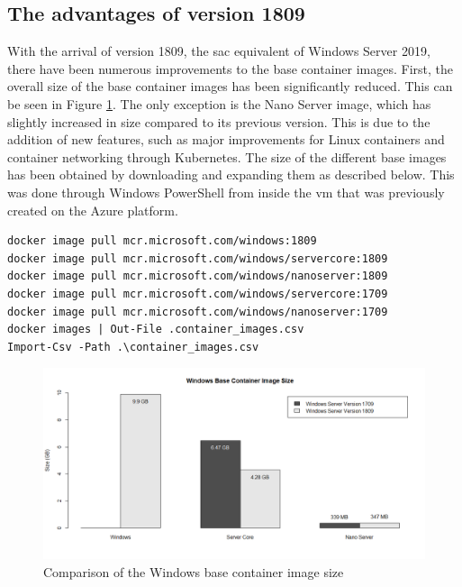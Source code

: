 \subsection{The advantages of version 1809}
With the arrival of version 1809, the \acrfull{sac} equivalent of Windows Server 2019, there have been numerous improvements to the base container images. 
First, the overall size of the base container images has been significantly reduced. 
This can be seen in Figure \ref{fig:Containers}. 
The only exception is the Nano Server image, which has slightly increased in size compared to its previous version. 
This is due to the addition of new features, such as major improvements for Linux containers and container networking through Kubernetes.
The size of the different base images has been obtained by downloading and expanding them as described below. 
This was done through Windows PowerShell from inside the \acrshort{vm} that was previously created on the Azure platform. 

\begin{lstlisting}[breaklines]
docker image pull mcr.microsoft.com/windows:1809
docker image pull mcr.microsoft.com/windows/servercore:1809
docker image pull mcr.microsoft.com/windows/nanoserver:1809  
docker image pull mcr.microsoft.com/windows/servercore:1709 
docker image pull mcr.microsoft.com/windows/nanoserver:1709   
docker images | Out-File .container_images.csv
Import-Csv -Path .\container_images.csv
\end{lstlisting}

\begin{figure}[h]
	\captionsetup{width=0.8\linewidth}
	\includegraphics[width=0.9\linewidth]{img/Methodologie/Containers0.png}
	\centering
	\caption[Image size comparison]{Comparison of the Windows base container image size}
	\label{fig:Containers}	
\end{figure}

